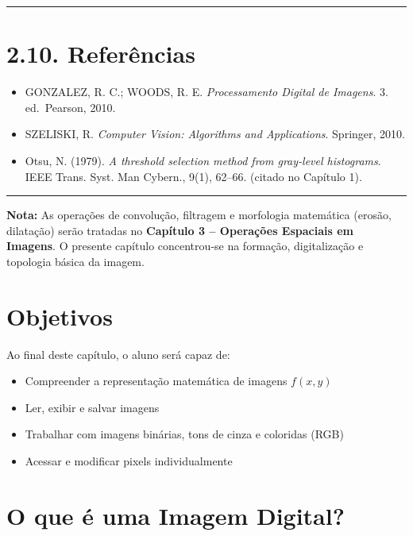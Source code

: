 \documentclass[
  portuguese,
  letterpaper,
  openany,
  oneside,
  12pt,
  a4paper]{book}
\providecommand{\tightlist}{%
  \setlength{\itemsep}{0pt}\setlength{\parskip}{0pt}}
\begin{document}
\begin{tcolorbox}
\begin{center}\rule{0.5\linewidth}{0.5pt}\end{center}

\section{2.10. Referências}\label{referuxeancias}

\begin{itemize}
\tightlist
\item
  GONZALEZ, R. C.; WOODS, R. E. \emph{Processamento Digital de Imagens}.
  3. ed.~Pearson, 2010.
\item
  SZELISKI, R. \emph{Computer Vision: Algorithms and Applications}.
  Springer, 2010.
\item
  Otsu, N. (1979). \emph{A threshold selection method from gray‑level
  histograms}. IEEE Trans. Syst. Man Cybern., 9(1), 62--66. (citado no
  Capítulo 1).
\end{itemize}

\begin{center}\rule{0.5\linewidth}{0.5pt}\end{center}

\textbf{Nota:} As operações de convolução, filtragem e morfologia
matemática (erosão, dilatação) serão tratadas no \textbf{Capítulo 3 --
Operações Espaciais em Imagens}. O presente capítulo concentrou‑se na
formação, digitalização e topologia básica da imagem.

\section{Objetivos}\label{objetivos-2}

Ao final deste capítulo, o aluno será capaz de:

\begin{itemize}
\tightlist
\item
  Compreender a representação matemática de imagens \(f(x,y)\)
\item
  Ler, exibir e salvar imagens
\item
  Trabalhar com imagens binárias, tons de cinza e coloridas (RGB)
\item
  Acessar e modificar pixels individualmente
\end{itemize}

\section{O que é uma Imagem
Digital?}\label{o-que-uxe9-uma-imagem-digital-1}


\end{tcolorbox}
\end{document}
